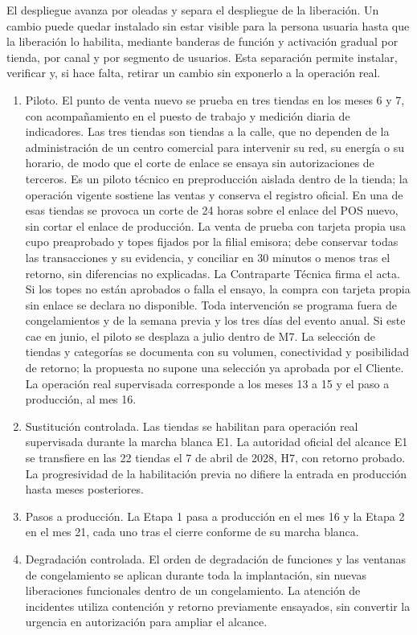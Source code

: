 \documentclass[11pt]{article}
\begin{document}
El despliegue avanza por oleadas y separa el despliegue de la liberación. Un cambio puede quedar instalado sin estar visible para la persona usuaria hasta que la liberación lo habilita, mediante banderas de función y activación gradual por tienda, por canal y por segmento de usuarios. Esta separación permite instalar, verificar y, si hace falta, retirar un cambio sin exponerlo a la operación real.

\begin{enumerate}
\item Piloto. El punto de venta nuevo se prueba en tres tiendas en los meses 6 y 7, con acompañamiento en el puesto de trabajo y medición diaria de indicadores. Las tres tiendas son tiendas a la calle, que no dependen de la administración de un centro comercial para intervenir su red, su energía o su horario, de modo que el corte de enlace se ensaya sin autorizaciones de terceros. Es un piloto técnico en preproducción aislada dentro de la tienda; la operación vigente sostiene las ventas y conserva el registro oficial. En una de esas tiendas se provoca un corte de 24 horas sobre el enlace del POS nuevo, sin cortar el enlace de producción. La venta de prueba con tarjeta propia usa cupo preaprobado y topes fijados por la filial emisora; debe conservar todas las transacciones y su evidencia, y conciliar en 30 minutos o menos tras el retorno, sin diferencias no explicadas. La Contraparte Técnica firma el acta. Si los topes no están aprobados o falla el ensayo, la compra con tarjeta propia sin enlace se declara no disponible. Toda intervención se programa fuera de congelamientos y de la semana previa y los tres días del evento anual. Si este cae en junio, el piloto se desplaza a julio dentro de M7. La selección de tiendas y categorías se documenta con su volumen, conectividad y posibilidad de retorno; la propuesta no supone una selección ya aprobada por el Cliente. La operación real supervisada corresponde a los meses 13 a 15 y el paso a producción, al mes 16.
\item Sustitución controlada. Las tiendas se habilitan para operación real supervisada durante la marcha blanca E1. La autoridad oficial del alcance E1 se transfiere en las 22 tiendas el 7 de abril de 2028, H7, con retorno probado. La progresividad de la habilitación previa no difiere la entrada en producción hasta meses posteriores.
\item Pasos a producción. La Etapa 1 pasa a producción en el mes 16 y la Etapa 2 en el mes 21, cada uno tras el cierre conforme de su marcha blanca.
\item Degradación controlada. El orden de degradación de funciones y las ventanas de congelamiento se aplican durante toda la implantación, sin nuevas liberaciones funcionales dentro de un congelamiento. La atención de incidentes utiliza contención y retorno previamente ensayados, sin convertir la urgencia en autorización para ampliar el alcance.
\end{enumerate}
\end{document}
